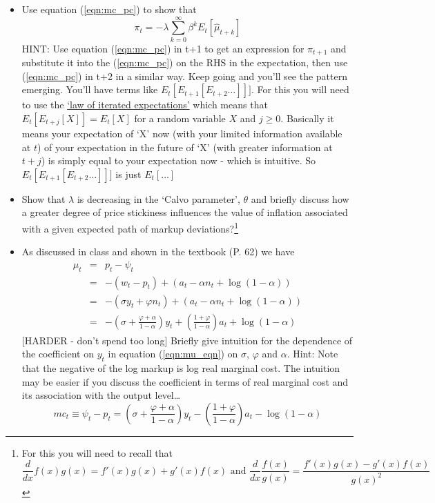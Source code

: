 \documentclass[authoryear,11pt]{elsarticle}
\begin{document}
\begin{itemize}
\item	Use equation (\ref{eqn:mc_pc}) to show that
\[
\pi_{t} = -\lambda \sum\limits_{k=0}^{\infty} \beta^{k} E_{t}[\hat{\mu}_{t+k}]
\]
HINT: Use equation (\ref{eqn:mc_pc}) in t+1 to get an expression for $\pi_{t+1}$ and substitute it into the (\ref{eqn:mc_pc}) on the RHS in the expectation, then use (\ref{eqn:mc_pc}) in t+2 in a similar way. Keep going and you'll see the pattern emerging. You'll have terms like $E_{t}[E_{t+1}[E_{t+2}\ldots]]]$. For this you will need to use the \href{https://en.wikipedia.org/wiki/Law_of_total_expectation}{`law of iterated expectations'} which means that $E_{t}[ E_{t+j}[ X ] ] = E_{t}[ X  ]$ for a random variable $X$ and $j\geq0$. Basically it means your expectation of `X' now (with your limited information available at $t$) of your expectation in the future of `X' (with greater information at $t+j$) is simply equal to your expectation now - which is intuitive. So $E_{t}[E_{t+1}[E_{t+2}\ldots]]]$ is just $E_{t}[\ldots]$
\item	Show that $\lambda$ is decreasing in the `Calvo parameter', $\theta$ and briefly discuss how a greater degree of price stickiness influences the value of inflation associated with a given expected path of markup deviations?\footnote{For this you will need to recall that
\[
\frac{d}{dx} f(x)g(x) = f'(x)g(x) + g'(x)f(x) \text{ and }\frac{d}{dx} \frac{f(x)}{g(x)} = \frac{f'(x)g(x)-g'(x)f(x)}{g(x)^{2}}
\]
}
\item	As discussed in class and shown in the textbook (P. 62) we have
\begin{eqnarray}
\mu_{t} &=& p_{t} - \psi_{t}	\nonumber \\
		&=& -(w_{t} - p_{t}) + (a_{t} - \alpha n_{t} + \log{(1-\alpha)}) \nonumber \\
		&=& -(\sigma y_{t} + \varphi n_{t}) + (a_{t} - \alpha n_{t} + \log{(1-\alpha)}) \nonumber\\
		&=& - \left( \sigma + \frac{\varphi + \alpha}{1-\alpha} \right)y_{t} + \left( \frac{1+\varphi}{1-\alpha} \right) a_{t} + \log{(1-\alpha)} \label{eqn:mu_eqn}
\end{eqnarray}
[HARDER - don't spend too long] Briefly give intuition for the dependence of the coefficient on $y_{t}$ in equation (\ref{eqn:mu_eqn}) on $\sigma$, $\varphi$ and $\alpha$. Hint: Note that the negative of the log markup is log real marginal cost. The intuition may be easier if you discuss the coefficient in terms of real marginal cost and its association with the output level\ldots
\[
mc_{t} \equiv \psi_{t} - p_{t}= \left( \sigma + \frac{\varphi + \alpha}{1-\alpha} \right)y_{t} - \left( \frac{1+\varphi}{1-\alpha} \right) a_{t} - \log{(1-\alpha)}
\]
\end{itemize}
\end{document}

